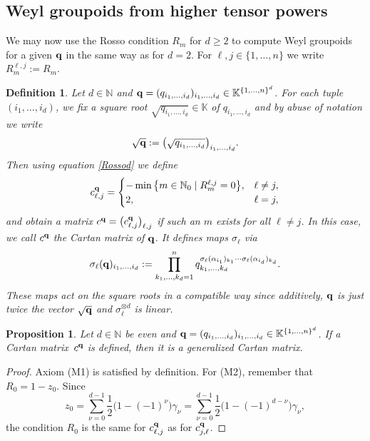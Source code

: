 \documentclass[pdftex]{sigma}
\numberwithin{equation}{section}
\newtheorem{Proposition}[Theorem]{Proposition}
\newtheorem{Definition}[Theorem]{Definition}
\newcommand{\NN }{\mathbb{N}}
\newcommand{\qq }{{\bf q}}
\newcommand{\KK }{\mathbb{K}}
\newcommand{\dn }{d}
\begin{document}
\subsection{Weyl groupoids from higher tensor powers}
We may now use the Rosso condition $R_m$ for $\dn\ge 2$ to compute Weyl groupoids for a given $\qq$ in the same way as for $\dn=2$.
For $\ell,j\in \{1,\dots,n\}$ we write $R^{\ell,j}_m:=R_m$.

\begin{Definition}\label{cartan_d}
Let $\dn\in\NN$ and
$\qq = (q_{i_1,\dots,i_\dn})_{i_1,\dots,i_\dn}\in \KK^{\{1,\dots,n\}^\dn}$.
For each tuple $(i_1,\dots,i_\dn)$, we fix a square root
$\sqrt{q_{i_1,\dots,i_\dn}}\in\KK$ of $q_{i_1,\dots,i_\dn}$ and
by abuse of notation we write
\[\sqrt{\qq}:=\big(\sqrt{q_{i_1,\dots,i_\dn}}\big)_{i_1,\dots,i_\dn}.\]
Then using equation \eqref{Rossod} we define
\begin{equation*}
c^\qq_{\ell,j} = \begin{cases} -\min\big\{ m\in\NN_0 \mid R^{\ell,j}_m = 0 \big\}, & \ell\ne j, \\
2, & \ell = j, \end{cases}
\end{equation*}
and obtain a matrix $c^\qq=\big(c^\qq_{\ell,j}\big)_{\ell,j}$ if such an $m$ exists for all $\ell\ne j$.
In this case, we call $c^\qq$ the {\it Cartan matrix} of $\qq$.
It defines maps $\sigma_\ell$ via
\[ \sigma_\ell(\qq)_{i_1,\dots,i_\dn} :=
\prod_{k_1,\dots,k_\dn=1}^n q_{k_1,\dots,k_\dn}^{\sigma_\ell(\alpha_{i_1})_{k_1}\cdots \sigma_\ell(\alpha_{i_\dn})_{k_\dn}}. \]
These maps act on the square roots in a compatible way since additively, $\qq$ is just twice the vector $\sqrt{\qq}$ and $\sigma_\ell^{\otimes \dn}$ is linear.
\end{Definition}

\begin{Proposition}\label{RdCartan}
Let $\dn\in \NN$ be even and
$\qq = (q_{i_1,\dots,i_\dn})_{i_1,\dots,i_\dn}\in \KK^{\{1,\dots,n\}^\dn}$.
If a Cartan matrix~$c^\qq$ is defined, then it is a generalized Cartan matrix.
\end{Proposition}
\begin{proof}
Axiom (M1) is satisfied by definition.
For (M2), remember that $R_0 = 1-z_0$. Since
\[z_0 = \sum_{\nu=0}^{d-1} \frac{1}{2}\big(1-(-1)^\nu\big)\gamma_\nu
= \sum_{\nu=0}^{d-1} \frac{1}{2}\big(1-(-1)^{d-\nu}\big)\gamma_\nu, \]
the condition $R_0$ is the same for $c^\qq_{\ell,j}$ as for $c^\qq_{j,\ell}$.
\end{proof}
\end{document}
